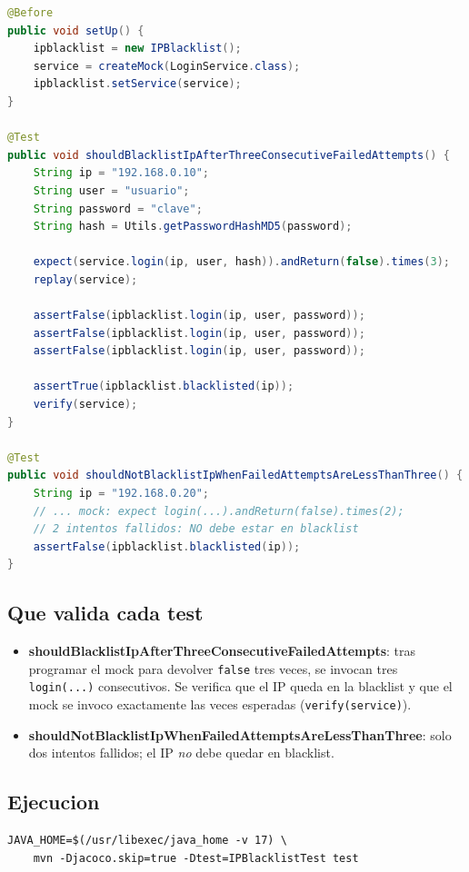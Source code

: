 \documentclass[12pt,a4paper]{article}
\begin{document}
\begin{lstlisting}[style=codestyle,language=Java]
@Before
public void setUp() {
    ipblacklist = new IPBlacklist();
    service = createMock(LoginService.class);
    ipblacklist.setService(service);
}

@Test
public void shouldBlacklistIpAfterThreeConsecutiveFailedAttempts() {
    String ip = "192.168.0.10";
    String user = "usuario";
    String password = "clave";
    String hash = Utils.getPasswordHashMD5(password);

    expect(service.login(ip, user, hash)).andReturn(false).times(3);
    replay(service);

    assertFalse(ipblacklist.login(ip, user, password));
    assertFalse(ipblacklist.login(ip, user, password));
    assertFalse(ipblacklist.login(ip, user, password));

    assertTrue(ipblacklist.blacklisted(ip));
    verify(service);
}

@Test
public void shouldNotBlacklistIpWhenFailedAttemptsAreLessThanThree() {
    String ip = "192.168.0.20";
    // ... mock: expect login(...).andReturn(false).times(2);
    // 2 intentos fallidos: NO debe estar en blacklist
    assertFalse(ipblacklist.blacklisted(ip));
}
\end{lstlisting}

\subsection{Que valida cada test}

\begin{itemize}
  \item \textbf{shouldBlacklistIpAfterThreeConsecutiveFailedAttempts}: tras programar el mock
  para devolver \texttt{false} tres veces, se invocan tres \texttt{login(...)} consecutivos.
  Se verifica que el IP queda en la blacklist y que el mock se invoco exactamente las veces
  esperadas (\texttt{verify(service)}).
  \item \textbf{shouldNotBlacklistIpWhenFailedAttemptsAreLessThanThree}: solo dos intentos
  fallidos; el IP \emph{no} debe quedar en blacklist.
\end{itemize}

\subsection{Ejecucion}

\begin{lstlisting}[style=codestyle]
JAVA_HOME=$(/usr/libexec/java_home -v 17) \
    mvn -Djacoco.skip=true -Dtest=IPBlacklistTest test
\end{lstlisting}
\end{document}
